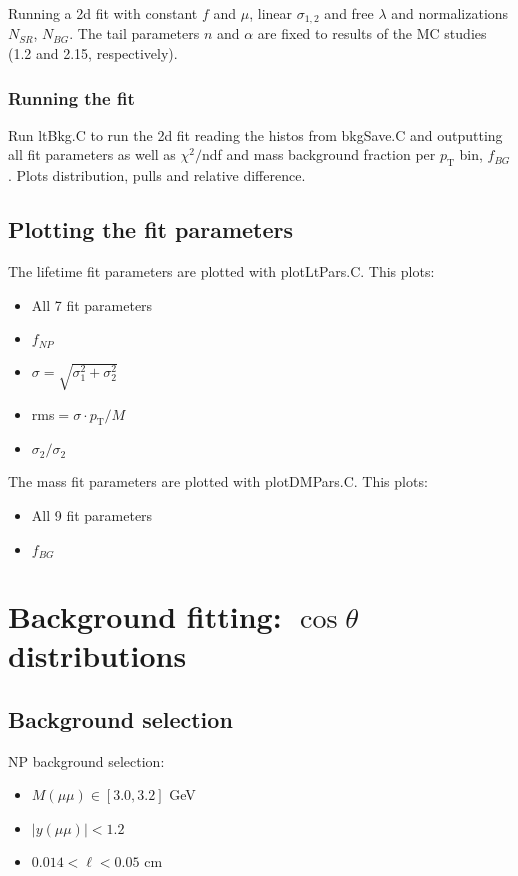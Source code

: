 \documentclass{article}
\newcommand{\pt}{p_\text{T}}
\newcommand{\cost}{\cos\theta}
\begin{document}
Running a 2d fit with constant $f$ and $\mu$, linear $\sigma_{1,2}$ and free $\lambda$ and normalizations $N_{SR}$, $N_{BG}$. The tail parameters $n$ and $\alpha$ are fixed to results of the MC studies (1.2 and 2.15, respectively). 

\subsubsection{Running the fit}

Run ltBkg.C to run the 2d fit reading the histos from bkgSave.C and outputting all fit parameters as well as $\chi^2/$ndf and mass background fraction per $\pt$ bin, $f_{BG}$. Plots distribution, pulls and relative difference.

\subsection{Plotting the fit parameters}

The lifetime fit parameters are plotted with plotLtPars.C. This plots:
\begin{itemize}
\item All 7 fit parameters
\item $f_{NP}$
\item $\sigma=\sqrt{\sigma_1^2+\sigma_2^2}$
\item rms$=\sigma\cdot\pt/M$
\item $\sigma_2/\sigma_2$
\end{itemize}

The mass fit parameters are plotted with plotDMPars.C. This plots:
\begin{itemize}
\item All 9 fit parameters
\item $f_{BG}$
\end{itemize}

\pagebreak

\section{Background fitting: $\cost$ distributions}
\subsection{Background selection}

NP background selection:
\begin{itemize}
\item $M(\mu\mu)\in[3.0,3.2]$ GeV
\item $|y(\mu\mu)|<1.2$
\item $0.014 < \ell < 0.05$ cm
\end{itemize}
\end{document}
